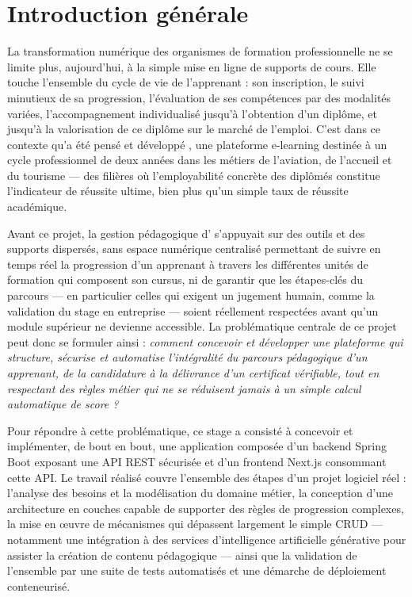 \documentclass[12pt,a4paper,oneside]{report}
\begin{document}
\cleardoublepage
{}
\setcounter{page}{1}

\chapter*{Introduction générale}

La transformation numérique des organismes de formation professionnelle ne
se limite plus, aujourd'hui, à la simple mise en ligne de supports de
cours. Elle touche l'ensemble du cycle de vie de l'apprenant : son
inscription, le suivi minutieux de sa progression, l'évaluation de ses
compétences par des modalités variées, l'accompagnement individualisé
jusqu'à l'obtention d'un diplôme, et jusqu'à la valorisation de ce diplôme
sur le marché de l'emploi. C'est dans ce contexte qu'a été pensé et
développé \Entreprise, une plateforme e-learning destinée à un cycle
professionnel de deux années dans les métiers de l'aviation, de l'accueil
et du tourisme --- des filières où l'employabilité concrète des diplômés
constitue l'indicateur de réussite ultime, bien plus qu'un simple taux de
réussite académique.

Avant ce projet, la gestion pédagogique d'\Entreprise{} s'appuyait sur des
outils et des supports dispersés, sans espace numérique centralisé
permettant de suivre en temps réel la progression d'un apprenant à travers
les différentes unités de formation qui composent son cursus, ni de
garantir que les étapes-clés du parcours --- en particulier celles qui
exigent un jugement humain, comme la validation du stage en entreprise ---
soient réellement respectées avant qu'un module supérieur ne devienne
accessible. La problématique centrale de ce projet peut donc se formuler
ainsi : \emph{comment concevoir et développer une plateforme qui structure,
sécurise et automatise l'intégralité du parcours pédagogique d'un
apprenant, de la candidature à la délivrance d'un certificat vérifiable,
tout en respectant des règles métier qui ne se réduisent jamais à un simple
calcul automatique de score ?}

Pour répondre à cette problématique, ce stage a consisté à
concevoir et implémenter, de bout en bout, une application composée d'un
backend Spring Boot exposant une API REST sécurisée et d'un frontend
Next.js consommant cette API. Le travail réalisé couvre l'ensemble des
étapes d'un projet logiciel réel : l'analyse des besoins et la
modélisation du domaine métier, la conception d'une architecture en
couches capable de supporter des règles de progression complexes, la mise
en \oe uvre de mécanismes qui dépassent largement le simple CRUD ---
notamment une intégration à des services d'intelligence artificielle
générative pour assister la création de contenu pédagogique --- ainsi que
la validation de l'ensemble par une suite de tests automatisés et une
démarche de déploiement conteneurisé.
\end{document}

